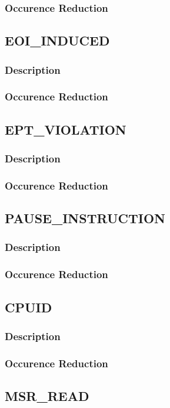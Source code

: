 \documentclass[MMR,Master,english]{twbook}
\begin{document}
\subsubsection{Occurence Reduction}
\clearpage
\subsection{EOI\_INDUCED}
\subsubsection{Description}
\subsubsection{Occurence Reduction}
\clearpage
\subsection{EPT\_VIOLATION}
\subsubsection{Description}
\subsubsection{Occurence Reduction}
\clearpage
\subsection{PAUSE\_INSTRUCTION}
\subsubsection{Description}
\subsubsection{Occurence Reduction}
\clearpage
\subsection{CPUID}
\subsubsection{Description}
\subsubsection{Occurence Reduction}
\clearpage
\subsection{MSR\_READ}
\end{document}
